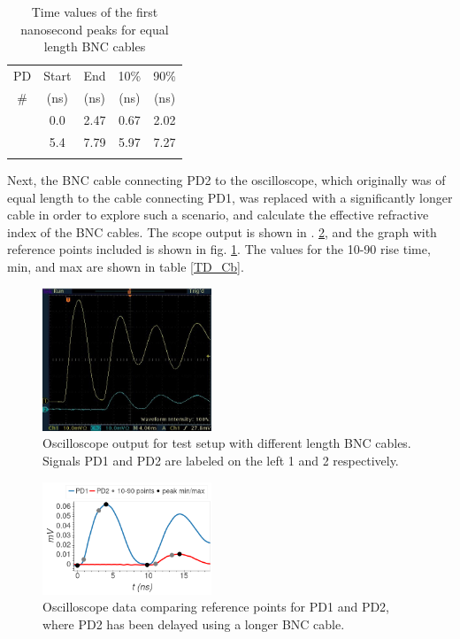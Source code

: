 \documentclass[aps,prl,reprint]{revtex4-2}
\begin{document}
\begin{table}[h]
\renewcommand{\arraystretch}{1.35}
\setlength{\tabcolsep}{10pt}
\caption{\label{TD_Ca}Time values of the first nanosecond peaks for equal length BNC cables}
\begin{tabular}{|c|c|c|c|c|}
\toprule
PD & Start & End & 10\% & 90\% \\
\# & (ns)& (ns)& (ns)& (ns)\\
\colrule
1 &    0.0 &  2.47 &  0.67 &  2.02 \\
\colrule
2 &    5.4 &  7.79 &  5.97 &  7.27 \\
\hline
\botrule
\end{tabular}
\end{table}

Next, the BNC cable connecting PD2 to the oscilloscope, which originally was of equal 
length to the cable connecting PD1, was replaced with a significantly longer cable in order
to explore such a scenario, and calculate the effective refractive index of the BNC
cables. The scope output is shown in \fig. \ref{diff}, and the graph with reference points 
included is shown in fig. \ref{setup2}. The values for the 10-90 rise time, min, and max are
shown in table \ref{TD_Cb}. \\


\begin{figure}[h]
\includegraphics[width=0.45\textwidth]{./BMPs/l4_C_c.jpg}
\caption{\label{setup2} Oscilloscope output for test setup with different length BNC cables.
Signals PD1 and PD2 are labeled on the left 1 and 2 respectively.}
\end{figure}

\begin{figure}[h]
\includegraphics[width=0.45\textwidth]{../Images/l4_C_a.png}
\caption{\label{diff} Oscilloscope data comparing reference points for PD1 and PD2, where PD2 
has been delayed using a longer BNC cable.}
\end{figure}
\end{document}
